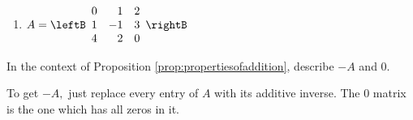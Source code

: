 \begin{enumialphparenastyle}
\begin{ex}
\begin{enumerate}
\item
$A = \leftB \begin{array}{rrr}
0 & 1 & 2 \\
1 & -1 & 3 \\
4 & 2 & 0 
\end{array} \rightB$
\end{enumerate}
\end{ex}

\begin{ex} In the context of Proposition \ref{prop:propertiesofaddition}, describe $-A$ and $0.$
\begin{sol}
To get $-A,$ just
replace every entry of $A$ with its additive inverse. The 0 matrix is the
one which has all zeros in it.
\end{sol}
\end{ex}

\end{enumialphparenastyle}